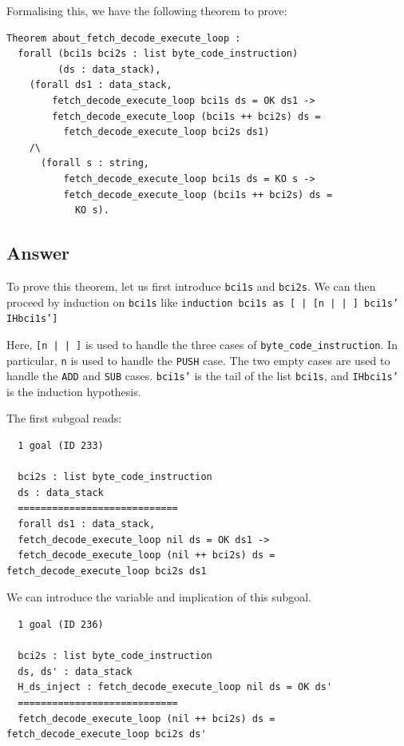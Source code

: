 \documentclass{article}
\begin{document}
Formalising this, we have the following theorem to prove:

\begin{lstlisting}
Theorem about_fetch_decode_execute_loop :
  forall (bci1s bci2s : list byte_code_instruction)
         (ds : data_stack),
    (forall ds1 : data_stack,
        fetch_decode_execute_loop bci1s ds = OK ds1 ->
        fetch_decode_execute_loop (bci1s ++ bci2s) ds =
          fetch_decode_execute_loop bci2s ds1)
    /\
      (forall s : string,
          fetch_decode_execute_loop bci1s ds = KO s ->
          fetch_decode_execute_loop (bci1s ++ bci2s) ds =
            KO s).
\end{lstlisting}

\subsection{Answer}

To prove this theorem, let us first introduce \texttt{bci1s} and \texttt{bci2s}. We can then proceed by induction on \texttt{bci1s} like \texttt{induction bci1s as [ | [n | | ]  bci1s' IHbci1s']}

Here, \texttt{[n | | ]} is used to handle the three cases of \texttt{byte\_code\_instruction}. In particular, \texttt{n} is used to handle the \texttt{PUSH} case. The two empty cases are used to handle the \texttt{ADD} and \texttt{SUB} cases. \texttt{bci1s'} is the tail of the list \texttt{bci1s}, and \texttt{IHbci1s'} is the induction hypothesis.

The first subgoal reads:

\begin{lstlisting}
  1 goal (ID 233)
  
  bci2s : list byte_code_instruction
  ds : data_stack
  ============================
  forall ds1 : data_stack,
  fetch_decode_execute_loop nil ds = OK ds1 ->
  fetch_decode_execute_loop (nil ++ bci2s) ds = fetch_decode_execute_loop bci2s ds1
\end{lstlisting}

We can introduce the variable and implication of this subgoal.

\begin{lstlisting}
  1 goal (ID 236)
  
  bci2s : list byte_code_instruction
  ds, ds' : data_stack
  H_ds_inject : fetch_decode_execute_loop nil ds = OK ds'
  ============================
  fetch_decode_execute_loop (nil ++ bci2s) ds = fetch_decode_execute_loop bci2s ds'
\end{lstlisting}
\end{document}
